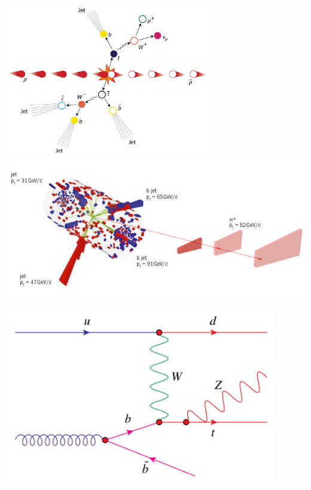 {{\begin{minipage}{20cm}
       \end{minipage}
       \begin{minipage}{15cm}
           \hspace{5cm}    \includegraphics[width=9cm]{top.png}
           \vspace{-1cm} \\
           \includegraphics[width=15cm]{top2.png} 
       \end{minipage}
       \begin{minipage}{16cm}
         \begin{center}
         \includegraphics[width=0.9\textwidth]{tZq2.png} 

\end{center}
\end{minipage}}}
